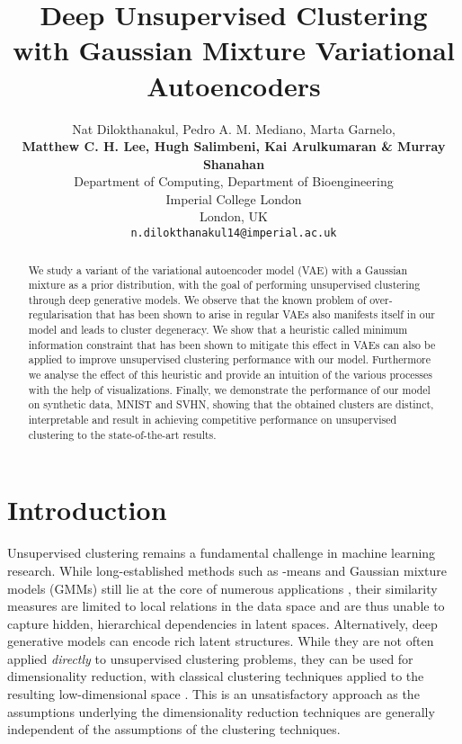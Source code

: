 \documentclass{article} \usepackage{iclr2017_conference,times}
\title{Deep Unsupervised Clustering with Gaussian Mixture Variational Autoencoders}
\author{Nat Dilokthanakul, Pedro A. M. Mediano, Marta Garnelo,\\
\textbf{Matthew C. H. Lee, Hugh Salimbeni, Kai Arulkumaran \& Murray Shanahan}\\
Department of Computing, Department of Bioengineering\\
Imperial College London\\
London, UK\\
\texttt{n.dilokthanakul14@imperial.ac.uk}
}
\begin{document}
\maketitle

\begin{abstract}








We study a variant of the variational autoencoder model (VAE) with a Gaussian mixture as a prior distribution, with the goal of performing unsupervised clustering through deep generative models. We observe that the known problem of over-regularisation that has been shown to arise in regular VAEs also manifests itself in our model and leads to cluster degeneracy. We show that a heuristic called minimum information constraint that has been shown to mitigate this effect in VAEs can also be applied to improve unsupervised clustering performance with our model. Furthermore we analyse the effect of this heuristic and provide an intuition of the various processes with the help of visualizations. Finally, we demonstrate the performance of our model on synthetic data, MNIST and SVHN, showing that the obtained clusters are distinct, interpretable and result in achieving competitive performance on unsupervised clustering to the state-of-the-art results. 

\end{abstract}


\section{Introduction}

Unsupervised clustering remains a fundamental challenge in machine learning research. While long-established methods such as -means and Gaussian mixture models (GMMs) \citep{bishop2006pattern} still lie at the core of numerous applications \citep{aggarwal2013data}, their similarity measures are limited to local relations in the data space and are thus unable to capture hidden, hierarchical dependencies in latent spaces. Alternatively, deep generative models can encode rich latent structures. While they are not often applied \emph{directly} to unsupervised clustering problems, they can be used for dimensionality reduction, with classical clustering techniques applied to the resulting low-dimensional space \citep{xie2015unsupervised}. This is an unsatisfactory approach as the assumptions underlying the dimensionality reduction techniques are generally independent of the assumptions of the clustering techniques.
\end{document}
